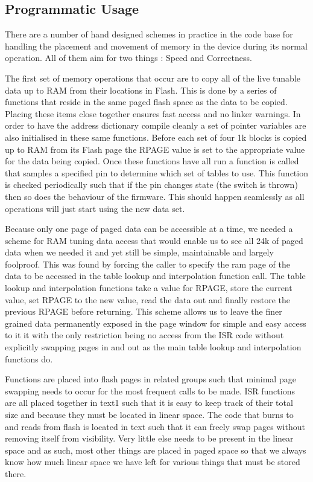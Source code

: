 \documentclass[12pt,a4wide,titlepage]{article}
\begin{document}
\begin{titlepage}
\begin{center}
\section{Programmatic Usage}

There are a number of hand designed schemes in practice in the code base for handling the placement and movement of memory in the device during its normal operation. All of them aim for two things : Speed and Correctness.

The first set of memory operations that occur are to copy all of the live tunable data up to RAM from their locations in Flash. This is done by a series of functions that reside in the same paged flash space as the data to be copied. Placing these items close together ensures fast access and no linker warnings. In order to have the address dictionary compile cleanly a set of pointer variables are also initialised in these same functions. Before each set of four 1k blocks is copied up to RAM from its Flash page the RPAGE value is set to the appropriate value for the data being copied. Once these functions have all run a function is called that samples a specified pin to determine which set of tables to use. This function is checked periodically such that if the pin changes state (the switch is thrown) then so does the behaviour of the firmware. This should happen seamlessly as all operations will just start using the new data set.

Because only one page of paged data can be accessible at a time, we needed a scheme for RAM tuning data access that would enable us to see all 24k of paged data when we needed it and yet still be simple, maintainable and largely foolproof. This was found by forcing the caller to specify the ram page of the data to be accessed in the table lookup and interpolation function call. The table lookup and interpolation functions take a value for RPAGE, store the current value, set RPAGE to the new value, read the data out and finally restore the previous RPAGE before returning. This scheme allows us to leave the finer grained data permanently exposed in the page window for simple and easy access to it it with the only restriction being no access from the ISR code without explicitly swapping pages in and out as the main table lookup and interpolation functions do.

Functions are placed into flash pages in related groups such that minimal page swapping needs to occur for the most frequent calls to be made. ISR functions are all placed together in text1 such that it is easy to keep track of their total size and because they must be located in linear space. The code that burns to and reads from flash is located in text such that it can freely swap pages without removing itself from visibility. Very little else needs to be present in the linear space and as such, most other things are placed in paged space so that we always know how much linear space we have left for various things that must be stored there.


\end{center}
\end{titlepage}
\end{document}
